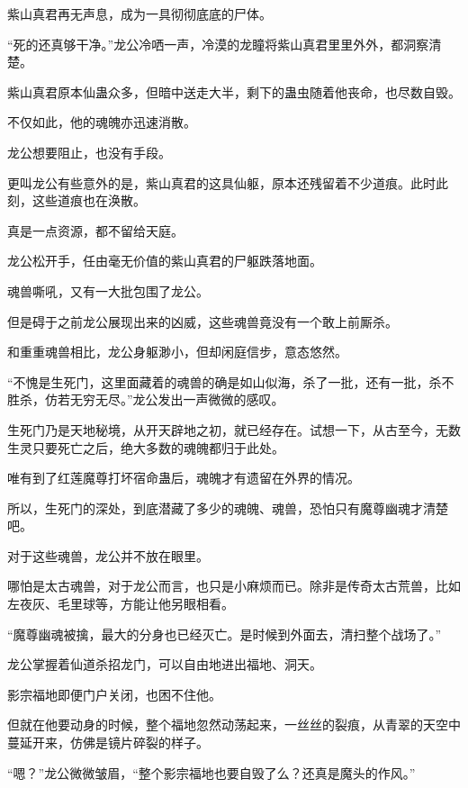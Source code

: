 
\begin{this_body}



紫山真君再无声息，成为一具彻彻底底的尸体。

“死的还真够干净。”龙公冷哂一声，冷漠的龙瞳将紫山真君里里外外，都洞察清楚。

紫山真君原本仙蛊众多，但暗中送走大半，剩下的蛊虫随着他丧命，也尽数自毁。

不仅如此，他的魂魄亦迅速消散。

龙公想要阻止，也没有手段。

更叫龙公有些意外的是，紫山真君的这具仙躯，原本还残留着不少道痕。此时此刻，这些道痕也在涣散。

真是一点资源，都不留给天庭。

龙公松开手，任由毫无价值的紫山真君的尸躯跌落地面。

魂兽嘶吼，又有一大批包围了龙公。

但是碍于之前龙公展现出来的凶威，这些魂兽竟没有一个敢上前厮杀。

和重重魂兽相比，龙公身躯渺小，但却闲庭信步，意态悠然。

“不愧是生死门，这里面藏着的魂兽的确是如山似海，杀了一批，还有一批，杀不胜杀，仿若无穷无尽。”龙公发出一声微微的感叹。

生死门乃是天地秘境，从开天辟地之初，就已经存在。试想一下，从古至今，无数生灵只要死亡之后，绝大多数的魂魄都归于此处。

唯有到了红莲魔尊打坏宿命蛊后，魂魄才有遗留在外界的情况。

所以，生死门的深处，到底潜藏了多少的魂魄、魂兽，恐怕只有魔尊幽魂才清楚吧。

对于这些魂兽，龙公并不放在眼里。

哪怕是太古魂兽，对于龙公而言，也只是小麻烦而已。除非是传奇太古荒兽，比如左夜灰、毛里球等，方能让他另眼相看。

“魔尊幽魂被擒，最大的分身也已经灭亡。是时候到外面去，清扫整个战场了。”

龙公掌握着仙道杀招龙门，可以自由地进出福地、洞天。

影宗福地即便门户关闭，也困不住他。

但就在他要动身的时候，整个福地忽然动荡起来，一丝丝的裂痕，从青翠的天空中蔓延开来，仿佛是镜片碎裂的样子。

“嗯？”龙公微微皱眉，“整个影宗福地也要自毁了么？还真是魔头的作风。”


\end{this_body}
